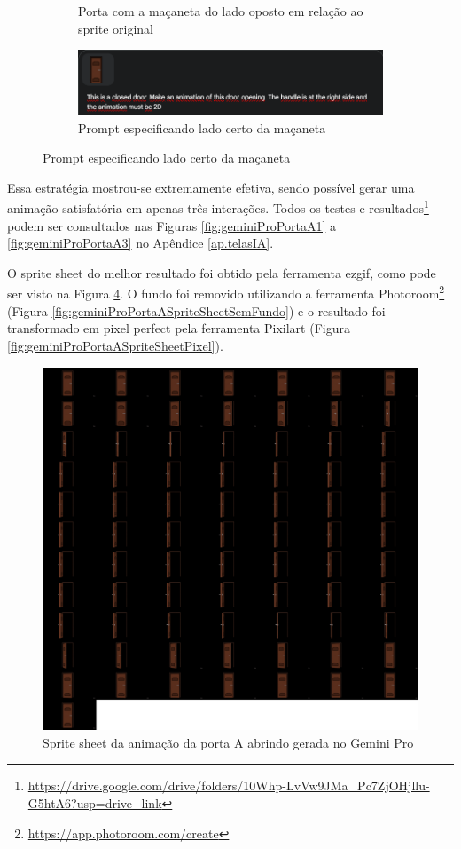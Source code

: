 \begin{figure}[htbp]
\begin{subfigure}{0.3\linewidth}
        \caption{\small Porta com a maçaneta do lado oposto em relação ao sprite original}
        \label{fig:geminiProPortaAMudaPromptErro}
    \end{subfigure}\hfill
    \begin{subfigure}{0.65\linewidth}
        \centering
        \includegraphics[width=1\linewidth]{figs/geminiPro/chat7/tela20.PNG}
        \caption{\small Prompt especificando lado certo da maçaneta}
        \label{fig:geminiProPortaAMudaPromptNovo}
    \end{subfigure}\hfill

\end{figure}

Essa estratégia mostrou-se extremamente efetiva, sendo possível gerar uma animação satisfatória em apenas três interações. Todos os testes e resultados\footnote{\url{https://drive.google.com/drive/folders/10Whp-LvVw9JMa_Pc7ZjOHjllu-G5htA6?usp=drive_link}} podem ser consultados nas Figuras \ref{fig:geminiProPortaA1} a \ref{fig:geminiProPortaA3} no Apêndice \ref{ap.telasIA}.

O sprite sheet do melhor resultado foi obtido pela ferramenta ezgif, como pode ser visto na Figura \ref{fig:geminiProPortaASpriteSheet}. O fundo foi removido utilizando a ferramenta Photoroom\footnote{\url{https://app.photoroom.com/create}} (Figura \ref{fig:geminiProPortaASpriteSheetSemFundo}) e o resultado foi transformado em pixel perfect pela ferramenta Pixilart (Figura \ref{fig:geminiProPortaASpriteSheetPixel}). 

\begin{figure}[htbp]
    \centering
    \caption{\small Sprite sheet da animação da porta A abrindo gerada no Gemini Pro}
    \label{fig:geminiProPortaASpriteSheet}
    \includegraphics[width=0.5\linewidth]{figs/geminiPro/sprite sheet/door_sprite_sheet.png}
\end{figure}

